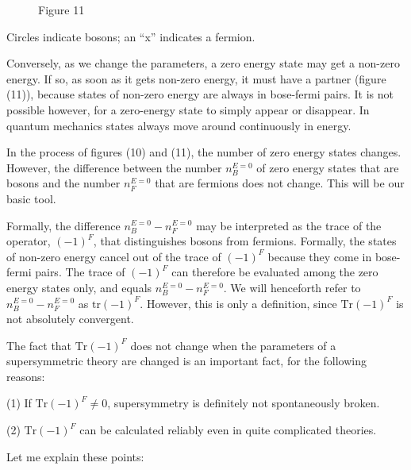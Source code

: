 \begin{figure}[h]
\centering

\caption*{Figure 11}
\end{figure}

Circles indicate bosons; an ``x'' indicates a fermion.

Conversely, as we change the parameters, a zero energy
state may get a non-zero energy. If so, as soon as it gets non-zero
energy, it must have a partner (figure (11)), because states
of non-zero energy are always in bose-fermi pairs. It is not possible
however, for a zero-energy state to simply appear or disappear.
In quantum mechanics states always move around continuously in
energy.\begingroup\renewcommand{\thefootnote}{\fnsymbol{footnote}}\footnotemark[1]\endgroup

In the process of figures (10) and (11), the number of zero
energy states changes. However, the difference between the number
$n_B^{E=0}$ of zero energy states that are bosons and the number $n_F^{E=0}$
that are fermions does not change. This will be our basic tool.

Formally, the difference $n_B^{E=0} - n_F^{E=0}$ may be interpreted as
the trace of the operator, $(-1)^F$, that distinguishes bosons from
fermions. Formally, the states of non-zero energy cancel out of the
trace of $(-1)^F$ because they come in bose-fermi pairs. The trace of
$(-1)^F$ can therefore be evaluated among the zero energy states only,
and equals $n_B^{E=0} - n_F^{E=0}$. We will henceforth refer to $n_B^{E=0} - n_F^{E=0}$
as $\mathrm{tr}(-1)^F$. However, this is only a definition, since $\mathrm{Tr}(-1)^F$ is
not absolutely convergent.

The fact that $\mathrm{Tr}(-1)^F$ does not change when the parameters of a
supersymmetric theory are changed is an important fact, for the following
reasons:

(1) If $\mathrm{Tr}(-1)^F \neq 0$, supersymmetry is definitely not spontaneously broken.

(2) $\mathrm{Tr}(-1)^F$ can be calculated reliably even in quite complicated theories.

\begingroup
\renewcommand{\thefootnote}{\fnsymbol{footnote}}
\endgroup

Let me explain these points:

